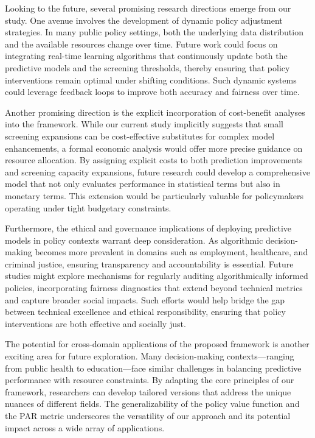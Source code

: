 \documentclass{article} %
\begin{document}
Looking to the future, several promising research directions emerge from our study. One avenue involves the development of dynamic policy adjustment strategies. In many public policy settings, both the underlying data distribution and the available resources change over time. Future work could focus on integrating real-time learning algorithms that continuously update both the predictive models and the screening thresholds, thereby ensuring that policy interventions remain optimal under shifting conditions. Such dynamic systems could leverage feedback loops to improve both accuracy and fairness over time.

Another promising direction is the explicit incorporation of cost-benefit analyses into the framework. While our current study implicitly suggests that small screening expansions can be cost-effective substitutes for complex model enhancements, a formal economic analysis would offer more precise guidance on resource allocation. By assigning explicit costs to both prediction improvements and screening capacity expansions, future research could develop a comprehensive model that not only evaluates performance in statistical terms but also in monetary terms. This extension would be particularly valuable for policymakers operating under tight budgetary constraints.

Furthermore, the ethical and governance implications of deploying predictive models in policy contexts warrant deep consideration. As algorithmic decision-making becomes more prevalent in domains such as employment, healthcare, and criminal justice, ensuring transparency and accountability is essential. Future studies might explore mechanisms for regularly auditing algorithmically informed policies, incorporating fairness diagnostics that extend beyond technical metrics and capture broader social impacts. Such efforts would help bridge the gap between technical excellence and ethical responsibility, ensuring that policy interventions are both effective and socially just.

The potential for cross-domain applications of the proposed framework is another exciting area for future exploration. Many decision-making contexts—ranging from public health to education—face similar challenges in balancing predictive performance with resource constraints. By adapting the core principles of our framework, researchers can develop tailored versions that address the unique nuances of different fields. The generalizability of the policy value function and the PAR metric underscores the versatility of our approach and its potential impact across a wide array of applications.
\end{document}
